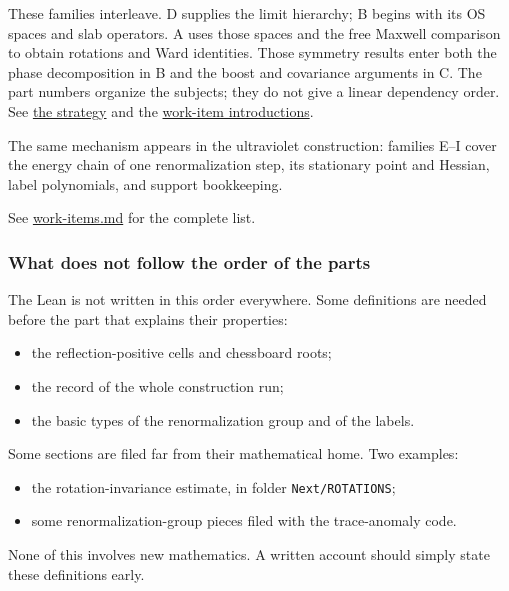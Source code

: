 \documentclass[
  letterpaper,
  11pt]{article}
\providecommand{\tightlist}{%
  \setlength{\itemsep}{0pt}\setlength{\parskip}{0pt}}
\begin{document}
These families interleave. D supplies the limit hierarchy; B begins with
its OS spaces and slab operators. A uses those spaces and the free
Maxwell comparison to obtain rotations and Ward identities. Those
symmetry results enter both the phase decomposition in B and the boost
and covariance arguments in C. The part numbers organize the subjects;
they do not give a linear dependency order. See
\href{https://github.com/scottnarmstrong/yang-mills-informalization/blob/main/summary.md\#the-strategy}{the
strategy} and the
\href{https://github.com/scottnarmstrong/yang-mills-informalization/blob/main/outline/work-items.md}{work-item
introductions}.

The same mechanism appears in the ultraviolet construction: families
E--I cover the energy chain of one renormalization step, its stationary
point and Hessian, label polynomials, and support bookkeeping.

See
\href{https://github.com/scottnarmstrong/yang-mills-informalization/blob/main/outline/work-items.md}{work-items.md}
for the complete list.

\subsubsection{What does not follow the order of the
parts}\label{what-does-not-follow-the-order-of-the-parts}

The Lean is not written in this order everywhere. Some definitions are
needed before the part that explains their properties:

\begin{itemize}
\tightlist
\item
  the reflection-positive cells and chessboard roots;
\item
  the record of the whole construction run;
\item
  the basic types of the renormalization group and of the labels.
\end{itemize}

Some sections are filed far from their mathematical home. Two examples:

\begin{itemize}
\tightlist
\item
  the rotation-invariance estimate, in folder \texttt{Next/ROTATIONS};
\item
  some renormalization-group pieces filed with the trace-anomaly code.
\end{itemize}

None of this involves new mathematics. A written account should simply
state these definitions early.
\end{document}
